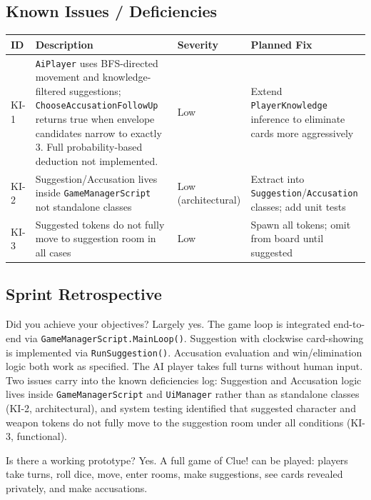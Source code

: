 \subsection*{Known Issues / Deficiencies}
\label{sec:sprint4-known-issues}

\begin{table}[H]
\centering
\footnotesize
\begin{tabular}{|l|p{4.5cm}|l|p{3.2cm}|}
\hline
\textbf{ID} & \textbf{Description} & \textbf{Severity} & \textbf{Planned Fix} \\ \hline
KI-1 & \texttt{AiPlayer} uses BFS-directed movement and knowledge-filtered suggestions; \texttt{ChooseAccusationFollowUp} returns true when envelope candidates narrow to exactly 3. Full probability-based deduction not implemented. & Low & Extend \texttt{PlayerKnowledge} inference to eliminate cards more aggressively \\ \hline
KI-2 & Suggestion/Accusation lives inside \texttt{GameManagerScript} not standalone classes & Low (architectural) & Extract into \texttt{Suggestion}/\texttt{Accusation} classes; add unit tests \\ \hline
KI-3 & Suggested tokens do not fully move to suggestion room in all cases & Low & Spawn all tokens; omit from board until suggested \\ \hline
\end{tabular}
\end{table}

\subsection*{Sprint Retrospective}

Did you achieve your objectives? Largely yes. The game loop is integrated end-to-end via \texttt{GameManagerScript.MainLoop()}. Suggestion with clockwise card-showing is implemented via \texttt{RunSuggestion()}. Accusation evaluation and win/elimination logic both work as specified. The AI player takes full turns without human input. Two issues carry into the known deficiencies log: Suggestion and Accusation logic lives inside \texttt{GameManagerScript} and \texttt{UiManager} rather than as standalone classes (KI-2, architectural), and system testing identified that suggested character and weapon tokens do not fully move to the suggestion room under all conditions (KI-3, functional).

Is there a working prototype? Yes. A full game of Clue! can be played: players take turns, roll dice, move, enter rooms, make suggestions, see cards revealed privately, and make accusations.

